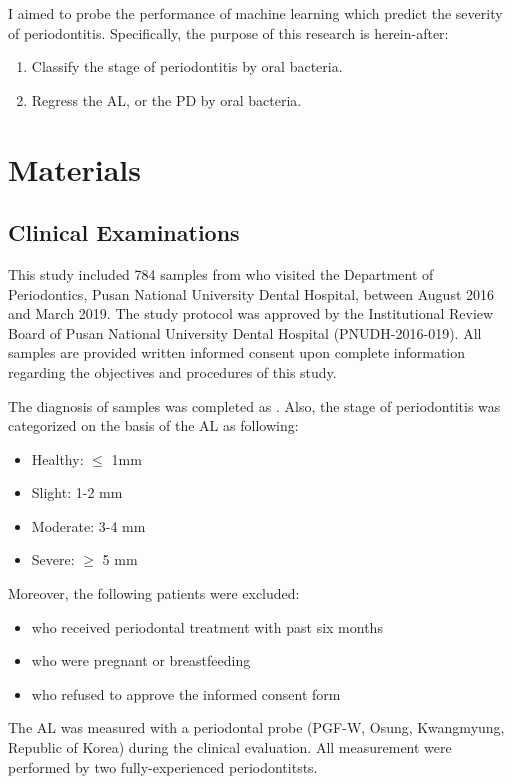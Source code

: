 \documentclass[aps, 11pt, a4paper]{article}
\begin{document}
			I aimed to probe the performance of machine learning which predict the severity of periodontitis. Specifically, the purpose of this research is herein-after:
    		\begin{enumerate}
				\item Classify the stage of periodontitis by oral bacteria.
				\item Regress the AL, or the PD by oral bacteria. 
    		\end{enumerate}
    
    \section{Materials}
    	\subsection{Clinical Examinations}
	    	This study included 784 samples from who visited the Department of Periodontics, Pusan National University Dental Hospital, between August 2016 and March 2019. The study protocol was approved by the Institutional Review Board of Pusan National University Dental Hospital (PNUDH-2016-019). All samples are provided written informed consent upon complete information regarding the objectives and procedures of this study.
	    	
	    	The diagnosis of samples was completed as \cite{ref:diagnosis1}. Also, the stage of periodontitis was categorized on the basis of the AL as following:
	    	\begin{itemize}
	    		\item Healthy: $\leq$ 1mm
				\item Slight: 1-2 mm
				\item Moderate: 3-4 mm
				\item Severe: $\geq$ 5 mm
	    	\end{itemize}
	    
	    	Moreover, the following patients were excluded:
	    	\begin{itemize}
				\item who received periodontal treatment with past six months
				\item who were pregnant or breastfeeding
				\item who refused to approve the informed consent form
	    	\end{itemize}
	    
	    	The AL was measured with a periodontal probe (PGF-W, Osung, Kwangmyung, Republic of Korea) during the clinical evaluation. All measurement were performed by two fully-experienced periodontitsts.
	    
\end{document}
